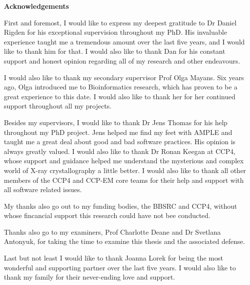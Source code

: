 \begin{center}
    \LARGE
    \textbf{Acknowledgements}
    \vspace{0.5cm}
\end{center}

First and foremost, I would like to express my deepest gratitude to Dr Daniel Rigden for his exceptional supervision throughout my PhD. His invaluable experience taught me a tremendous amount over the last five years, and I would like to thank him for that. I would also like to thank Dan for his constant support and honest opinion regarding all of my research and other endeavours.

I would also like to thank my secondary supervisor Prof Olga Mayans. Six years ago, Olga introduced me to Bioinformatics research, which has proven to be a great experience to this date. I would also like to thank her for her continued support throughout all my projects.

Besides my supervisors, I would like to thank Dr Jens Thomas for his help throughout my PhD project. Jens helped me find my feet with AMPLE and taught me a great deal about good and bad software practices. His opinion is always greatly valued. I would also like to thank Dr Ronan Keegan at CCP4, whose support and guidance helped me understand the mysterious and complex world of X-ray crystallography a little better. I would also like to thank all other members of the CCP4 and CCP-EM core teams for their help and support with all software related issues.

My thanks also go out to my funding bodies, the BBSRC and CCP4, without whose fincancial support this research could have not bee conducted.

Thanks also go to my examiners, Prof Charlotte Deane and Dr Svetlana Antonyuk, for taking the time to examine this thesis and the associated defense.

Last but not least I would like to thank Joanna Lorek for being the most wonderful and supporting partner over the last five years. I would also like to thank my family for their never-ending love and support.
